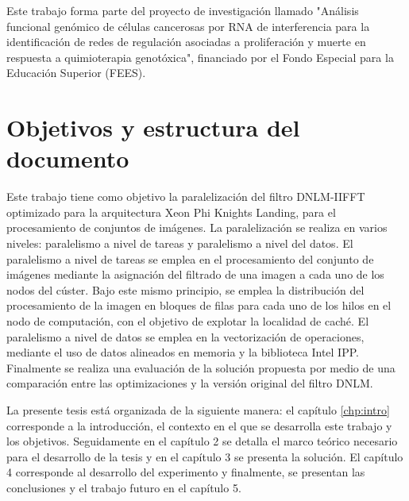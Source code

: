 Este trabajo forma parte del proyecto de investigaci\'on llamado "Análisis funcional genómico de células cancerosas por RNA de interferencia para la identificación de redes de regulación asociadas a proliferación y muerte en respuesta a quimioterapia genotóxica", financiado por el Fondo Especial para la Educaci\'on Superior (FEES).


\section{Objetivos y estructura del documento}


Este trabajo tiene como objetivo la paralelizaci\'on del filtro DNLM-IIFFT optimizado para la arquitectura Xeon Phi Knights Landing, para el procesamiento de conjuntos de im\'agenes. La paralelizaci\'on se realiza en varios niveles: paralelismo a nivel de tareas y paralelismo a nivel del datos. El paralelismo a nivel de tareas se emplea en el procesamiento del conjunto de im\'agenes mediante la asignaci\'on del filtrado de una imagen a cada uno de los nodos del c\'uster. Bajo este mismo principio, se emplea la distribuci\'on del procesamiento de la imagen en bloques de filas para cada uno de los hilos en el nodo de computaci\'on, con el objetivo de explotar la localidad de cach\'e. El paralelismo a nivel de datos se emplea en la vectorizaci\'on de operaciones, mediante el uso de datos alineados en memoria y la biblioteca Intel IPP. Finalmente se realiza una evaluaci\'on de la soluci\'on propuesta por medio de una comparaci\'on entre las optimizaciones y la versi\'on original del filtro DNLM.


La presente tesis est\'a organizada de la siguiente manera: el cap\'itulo \ref{chp:intro} corresponde a la introducci\'on, el contexto en el que se desarrolla este trabajo y los objetivos. Seguidamente en el cap\'itulo 2 se detalla el marco te\'orico necesario para el desarrollo de la tesis y en el cap\'itulo 3 se presenta la soluci\'on. El cap\'itulo 4 corresponde al desarrollo del experimento y finalmente, se presentan las conclusiones y el trabajo futuro en el cap\'itulo 5. 


%

